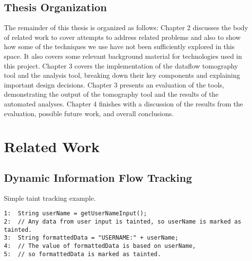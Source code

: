 \documentclass[msc,oneside]{ubcthesis}
\begin{document}
\section{Thesis Organization}
	
The remainder of this thesis is organized as follows: Chapter 2 discusses the body of related work to cover attempts to address related problems and also to show how some of the techniques we use have not been sufficiently explored in this space. It also covers some relevant background material for technologies used in this project. Chapter 3 covers the implementation of the dataflow tomography tool and the analysis tool, breaking down their key components and explaining important design decisions. Chapter 3 presents an evaluation of the tools, demonstrating the output of the tomography tool and the results of the automated analyses. Chapter 4 finishes with a discussion of the results from the evaluation, possible future work, and overall conclusions.
	
\chapter{Related Work}
\label{sec:relwork}

\section{Dynamic Information Flow Tracking}
	
\begin{Program}
  \caption{\label{prog:code1} Simple taint tracking example.}
\begin{verbatim}
1:	String userName = getUserNameInput(); 
2:	// Any data from user input is tainted, so userName is marked as tainted.
3:	String formattedData = "USERNAME:" + userName; 
4:	// The value of formattedData is based on userName, 
5:	// so formattedData is marked as tainted.
\end{verbatim}
\end{Program}	
	
\end{document}
